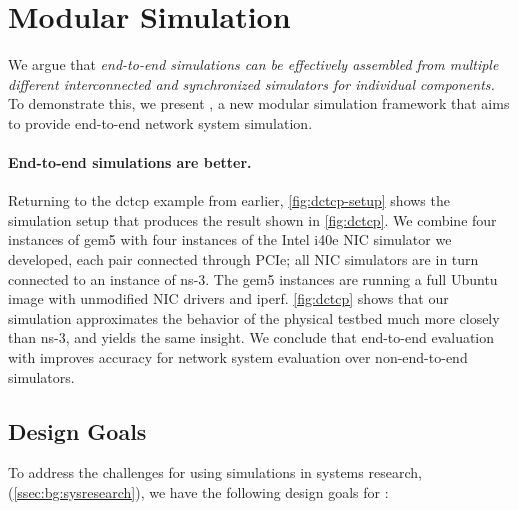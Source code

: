 \section{Modular Simulation}
\label{sec:approach}
We argue that \emph{end-to-end simulations can be effectively
assembled from multiple different interconnected and synchronized
simulators for individual components.}
%
To demonstrate this, we present \sysname, a new modular simulation
framework that aims to provide end-to-end network system simulation.

\paragraph{End-to-end simulations are better.}
Returning to the dctcp example from earlier, \autoref{fig:dctcp-setup}
shows the simulation setup that produces the result shown in
\autoref{fig:dctcp}.
%
We combine four instances of gem5 with four instances of the Intel
i40e NIC simulator we developed, each pair connected through PCIe;
all NIC simulators are in turn connected to an instance of ns-3.
%
The gem5 instances are running a full Ubuntu image with
unmodified NIC drivers and iperf.
%
\autoref{fig:dctcp} shows that our \sysname simulation approximates
the behavior of the physical testbed much more closely than ns-3, and
yields the same insight.
%
We conclude that end-to-end evaluation with \sysname improves accuracy
for network system evaluation over non-end-to-end simulators.


\subsection{Design Goals}
\label{ssec:approach:goals}
To address the challenges for using simulations in systems research,
(\autoref{ssec:bg:sysresearch}), we have the following design goals
for
\sysname:

